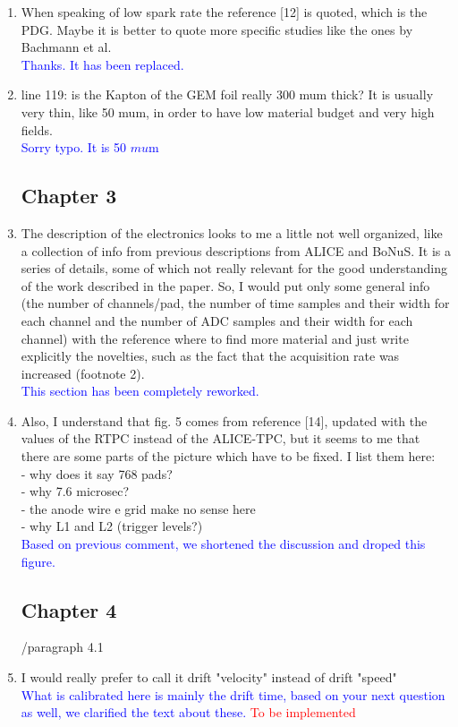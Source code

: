 \documentclass[a4paper,11pt,twoside]{article}
\begin{document}
\begin{enumerate}
\item When speaking of low spark rate the reference [12] is quoted, which is 
   the PDG. Maybe it is better to quote more specific studies like the ones by 
   Bachmann et al.\\
\textcolor{blue}{Thanks. It has been replaced.} 

\item line 119: is the Kapton of the GEM foil really 300 mum thick? It is 
   usually very thin, like 50 mum, in order to have low material budget and 
   very high fields.\\
\textcolor{blue}{Sorry typo. It is 50 $mu$m} 

\subsection*{ Chapter 3}
\item The description of the electronics looks to me a little not well 
   organized, like a collection of info from previous descriptions from ALICE 
   and BoNuS. It is a series of details, some of which not really relevant for 
   the good understanding of the work described in the paper. So, I would put 
   only some general info (the number of channels/pad, the number of time 
   samples and their width for each channel and the number of  ADC samples and 
   their width for each channel) with the reference where to find more material 
   and just write explicitly the novelties, such as the fact that the 
   acquisition rate was increased (footnote 2).\\
\textcolor{blue}{This section has been completely reworked.} 

\item Also, I understand that fig. 5 comes from reference [14], updated with 
   the values of the RTPC instead of the ALICE-TPC, but it seems to me that 
   there are some parts of the picture which have to be fixed. I list them 
   here:\\
- why does it say 768 pads?\\
- why 7.6 microsec?\\
- the anode wire e grid make no sense here\\
- why L1 and L2 (trigger levels?) \\
\textcolor{blue}{Based on previous comment, we shortened the discussion and 
droped this figure. } 

\subsection*{ Chapter 4}
	/paragraph 4.1
\item I would really prefer to call it drift "velocity" instead of drift 
   "speed"\\
\textcolor{blue}{What is calibrated here is mainly the drift time, based 
on your next question as well, we clarified the text about these.} 
\textcolor{red}{To be implemented}


\end{enumerate}
\end{document}
